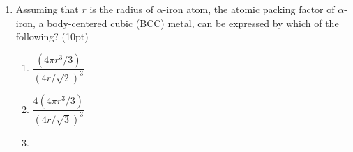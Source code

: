 \documentclass[10pt]{article}
\begin{document}
\begin{enumerate}[leftmargin=0.7cm, label=\textbf{\arabic*.}, itemsep=1em]
\begin{itemize}[leftmargin=0.5cm]
        \item \textbf{Calculation of APF:} Substituting the values into the APF formula:
        \[
        \text{APF} = \frac{\frac{16}{3} \pi r^3}{16\sqrt{2} r^3} = \frac{16 \pi}{48 \sqrt{2}} = \frac{\pi}{3 \sqrt{2}} \approx 0.74
        \]
        Thus, the APF for the fcc structure is approximately 0.74, indicating that 74\% of the unit cell's volume is occupied by atoms.
    \end{itemize}
    \begin{center}
    \end{center}

    \newpage
	\item Assuming that \( r \) is the radius of \(\alpha\)-iron atom, the atomic packing factor of \(\alpha\)-iron, a body-centered cubic (BCC) metal, can be expressed by which of the following? (10pt)
    \begin{enumerate}[label=\textbf{\alph*.}, leftmargin=0.7cm, itemsep=0.5em]
        \item $\dfrac{\left( 4 \pi r^3 / 3 \right)}{\left( 4r / \sqrt{2} \right)^3}$
        
        \item $\dfrac{4 \left( 4 \pi r^3 / 3 \right)}{\left( 4r / \sqrt{3} \right)^3}$
        
        \item {}
        

\end{enumerate}
\end{enumerate}
\end{document}
